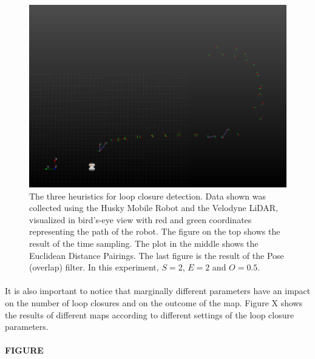 \documentclass[12pt]{article}
\begin{document}
\begin{figure}
\begin{minipage}{0.67\textwidth}
				\includegraphics[width=\textwidth]{LoopClosureFinal}
	\end{minipage}\hfill
	\begin{minipage}{0.33\textwidth}
		\centering
		\caption[t]{The three heuristics for loop closure detection. Data shown was collected using the Husky Mobile Robot and the Velodyne LiDAR, visualized in bird's-eye view with red and green coordinates representing the path of the robot. The figure on the top shows the result of the time sampling. The plot in the middle shows the Euclidean Distance Pairings. The last figure is the result of the Pose (overlap) filter. In this experiment, $S=2$, $E=2$ and $O=0.5$.}
		\label{fig:loopClosureDetection}
	\end{minipage}
	\end{figure}
	\paragraph{}
	It is also important to notice that marginally different parameters have an impact on the number of loop closures and on the outcome of the map. Figure X shows the results of different maps according to different settings of the loop closure parameters.
		
	\paragraph{FIGURE}
	
\end{document}
